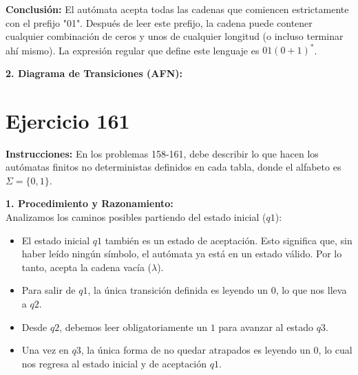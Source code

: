 \documentclass[12pt]{article}
\begin{document}
\vspace{0.3cm}
\textbf{Conclusión:} El autómata acepta todas las cadenas que comiencen estrictamente con el prefijo "01". Después de leer este prefijo, la cadena puede contener cualquier combinación de ceros y unos de cualquier longitud (o incluso terminar ahí mismo). La expresión regular que define este lenguaje es $01(0+1)^{*}$.

\vspace{0.5cm}

\textbf{2. Diagrama de Transiciones (AFN):}

\begin{center}
\end{center}

\section*{Ejercicio 161}

\textbf{Instrucciones:} En los problemas 158-161, debe describir lo que hacen los autómatas finitos no deterministas definidos en cada tabla, donde el alfabeto es $\Sigma=\{0,1\}$.

\vspace{0.5cm}

\textbf{1. Procedimiento y Razonamiento:} \\
Analizamos los caminos posibles partiendo del estado inicial ($q1$):
\begin{itemize}
    \item El estado inicial $q1$ también es un estado de aceptación. Esto significa que, sin haber leído ningún símbolo, el autómata ya está en un estado válido. Por lo tanto, acepta la cadena vacía ($\lambda$).
    \item Para salir de $q1$, la única transición definida es leyendo un $0$, lo que nos lleva a $q2$.
    \item Desde $q2$, debemos leer obligatoriamente un $1$ para avanzar al estado $q3$.
    \item Una vez en $q3$, la única forma de no quedar atrapados es leyendo un $0$, lo cual nos regresa al estado inicial y de aceptación $q1$.
\end{itemize}
\end{document}
